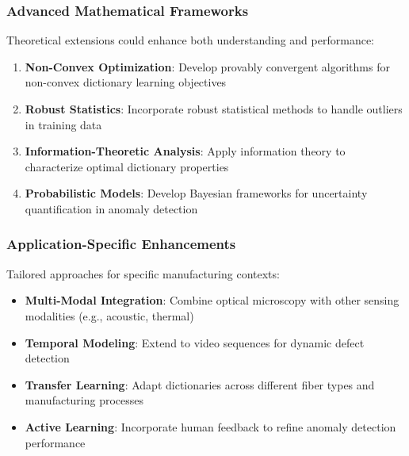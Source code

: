 \documentclass[12pt]{article}
\begin{document}
\subsubsection{Advanced Mathematical Frameworks}
\label{subsubsec:advanced_frameworks}

Theoretical extensions could enhance both understanding and performance:

\begin{enumerate}[leftmargin=*]
    \item \textbf{Non-Convex Optimization}: Develop provably convergent algorithms for non-convex dictionary learning objectives

    \item \textbf{Robust Statistics}: Incorporate robust statistical methods to handle outliers in training data

    \item \textbf{Information-Theoretic Analysis}: Apply information theory to characterize optimal dictionary properties

    \item \textbf{Probabilistic Models}: Develop Bayesian frameworks for uncertainty quantification in anomaly detection
\end{enumerate}

\subsubsection{Application-Specific Enhancements}
\label{subsubsec:application_enhancements}

Tailored approaches for specific manufacturing contexts:

\begin{itemize}[leftmargin=*]
    \item \textbf{Multi-Modal Integration}: Combine optical microscopy with other sensing modalities (e.g., acoustic, thermal)

    \item \textbf{Temporal Modeling}: Extend to video sequences for dynamic defect detection

    \item \textbf{Transfer Learning}: Adapt dictionaries across different fiber types and manufacturing processes

    \item \textbf{Active Learning}: Incorporate human feedback to refine anomaly detection performance
\end{itemize}
\end{document}
